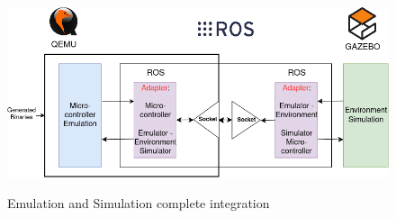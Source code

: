 \documentclass[../../monografia.tex]{subfiles}
\begin{document}
\begin{figure}[h!]
    \caption{Emulation and Simulation complete integration}
    \centering
    \includegraphics[width=16cm]{src/images/complete_integration.png}
    \label{fig: Emulation and Simulation complete integration}
\end{figure}











\end{document}
